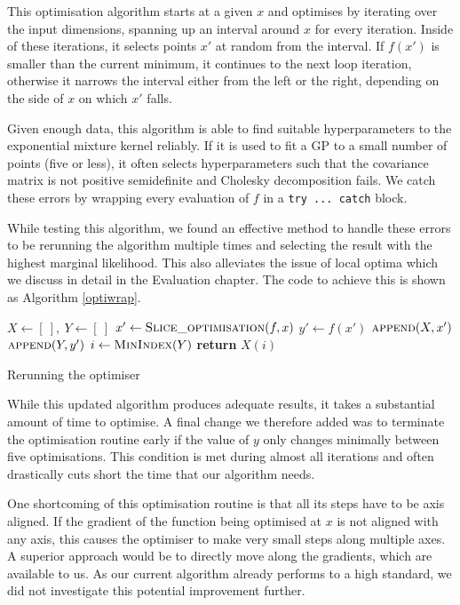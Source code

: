 \documentclass[a4paper,12pt,twoside,openright]{report}
\begin{document}
This optimisation algorithm starts at a given $x$ and optimises by iterating over the input dimensions, spanning up an interval around $x$ for every iteration. Inside of these iterations, it selects points $x'$ at random from the interval. If $f(x')$ is smaller than the current minimum, it continues to the next loop iteration, otherwise it narrows the interval either from the left or the right, depending on the side of $x$ on which $x'$ falls.

Given enough data, this algorithm is able to find suitable hyperparameters to the exponential mixture kernel reliably. If it is used to fit a GP to a small number of points (five or less), it often selects hyperparameters such that the covariance matrix is not positive semidefinite and Cholesky decomposition fails. We catch these errors by wrapping every evaluation of $f$ in a \texttt{try ... catch} block. 

While testing this algorithm, we found an effective method to handle these errors to be rerunning the algorithm multiple times and selecting the result with the highest marginal likelihood. This also alleviates the issue of local optima which we discuss in detail in the Evaluation chapter. The code to achieve this is shown as Algorithm \ref{optiwrap}.

\begin{algorithm}
\begin{algorithmic}[1]
\State $X \gets [\ ],\ Y \gets [\ ]$
\State $x'\gets \Call{Slice\_optimisation}{f, x}$
\State $y'\gets f(x')$
\State $\Call{append}{X, x'}$
\State $\Call{append}{Y, y'}$
\EndFor
\State $i\gets \Call{MinIndex}{Y}$
\State \textbf{return} $X(i)$
\EndProcedure
\end{algorithmic}
\caption{Rerunning the optimiser}
\label{optiwrap}
\end{algorithm}

While this updated algorithm produces adequate results, it takes a substantial amount of time to optimise. A final change we therefore added was to terminate the optimisation routine early if the value of $y$ only changes minimally between five optimisations. This condition is met during almost all iterations and often drastically cuts short the time that our algorithm needs.

One shortcoming of this optimisation routine is that all its steps have to be axis aligned. If the gradient of the function being optimised at $x$ is not aligned with any axis, this causes the optimiser to make very small steps along multiple axes. A superior approach would be to directly move along the gradients, which are available to us. As our current algorithm already performs to a high standard, we did not investigate this potential improvement further.
\end{document}
